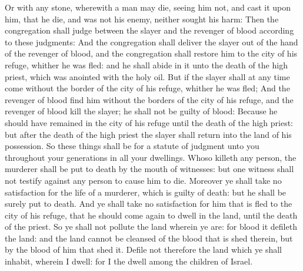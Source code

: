 \begin{biblechapter}
\verse Or with any stone, wherewith a man may die, seeing him not, and cast it upon him, that he die, and was not his enemy, neither sought his harm:
\verse Then the congregation shall judge between the slayer and the revenger of blood according to these judgments:
\verse And the congregation shall deliver the slayer out of the hand of the revenger of blood, and the congregation shall restore him to the city of his refuge, whither he was fled: and he shall abide in it unto the death of the high priest, which was anointed with the holy oil.
\verse But if the slayer shall at any time come without the border of the city of his refuge, whither he was fled;
\verse And the revenger of blood find him without the borders of the city of his refuge, and the revenger of blood kill the slayer; he shall not be guilty of blood:
\verse Because he should have remained in the city of his refuge until the death of the high priest: but after the death of the high priest the slayer shall return into the land of his possession.
\verse So these things shall be for a statute of judgment unto you throughout your generations in all your dwellings.
\verse Whoso killeth any person, the murderer shall be put to death by the mouth of witnesses: but one witness shall not testify against any person to cause him to die.
\verse Moreover ye shall take no satisfaction for the life of a murderer, which is guilty of death: but he shall be surely put to death.
\verse And ye shall take no satisfaction for him that is fled to the city of his refuge, that he should come again to dwell in the land, until the death of the priest.
\verse So ye shall not pollute the land wherein ye are: for blood it defileth the land: and the land cannot be cleansed of the blood that is shed therein, but by the blood of him that shed it.
\verse Defile not therefore the land which ye shall inhabit, wherein I dwell: for I the \LORD dwell among the children of Israel.
\end{biblechapter}


